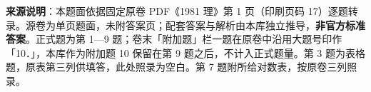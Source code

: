 


\begin{gktip}
\textbf{来源说明}：本题面依据固定原卷 PDF《1981 理》第 1 页（印刷页码 17）逐题转录。源卷为单页题面，未附答案页；配套答案与解析由本库独立推导，\textbf{非官方标准答案}。正式题为第 1—9 题；卷末「附加题」栏一题在原卷中沿用大题号印作「10．」，本库作为附加题 10 保留在第 9 题之后，不计入正式题量。第 3 题为表格题，原表第三列供填答，此处照录为空白。第 7 题附所给对数表，按原卷三列照录。
\end{gktip}

\par\medskip


